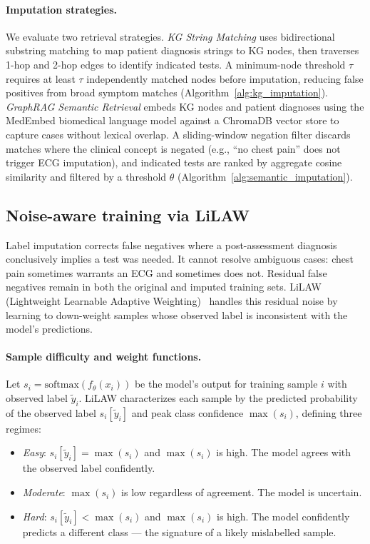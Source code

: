 \paragraph{Imputation strategies.}
We evaluate two retrieval strategies. \textit{KG String Matching} uses bidirectional substring matching to map patient diagnosis strings to KG nodes, then traverses 1-hop and 2-hop edges to identify indicated tests. A minimum-node threshold $\tau$ requires at least $\tau$ independently matched nodes before imputation, reducing false positives from broad symptom matches (Algorithm~\ref{alg:kg_imputation}). \textit{GraphRAG Semantic Retrieval} embeds KG nodes and patient diagnoses using the MedEmbed biomedical language model against a ChromaDB vector store to capture cases without lexical overlap. A sliding-window negation filter discards matches where the clinical concept is negated (e.g., ``no chest pain'' does not trigger ECG imputation), and indicated tests are ranked by aggregate cosine similarity and filtered by a threshold $\theta$ (Algorithm~\ref{alg:semantic_imputation}).

\subsection{Noise-aware training via LiLAW}

Label imputation corrects false negatives where a post-assessment diagnosis conclusively implies a test was needed. It cannot resolve ambiguous cases: chest pain sometimes warrants an ECG and sometimes does not. Residual false negatives remain in both the original and imputed training sets. LiLAW (Lightweight Learnable Adaptive Weighting)~\cite{moturu_lilaw_2025} handles this residual noise by learning to down-weight samples whose observed label is inconsistent with the model's predictions.

\paragraph{Sample difficulty and weight functions.}

Let $s_i = \mathrm{softmax}(f_\theta(x_i))$ be the model's output for training sample $i$ with observed label $\tilde{y}_i$. LiLAW characterizes each sample by the predicted probability of the observed label $s_i[\tilde{y}_i]$ and peak class confidence $\max(s_i)$, defining three regimes:

\begin{itemize}
    \item \textit{Easy}: $s_i[\tilde{y}_i] = \max(s_i)$ and $\max(s_i)$ is high. The model agrees with the observed label confidently.
    \item \textit{Moderate}: $\max(s_i)$ is low regardless of agreement. The model is uncertain.
    \item \textit{Hard}: $s_i[\tilde{y}_i] < \max(s_i)$ and $\max(s_i)$ is high. The model confidently predicts a different class — the signature of a likely mislabelled sample.
\end{itemize}

